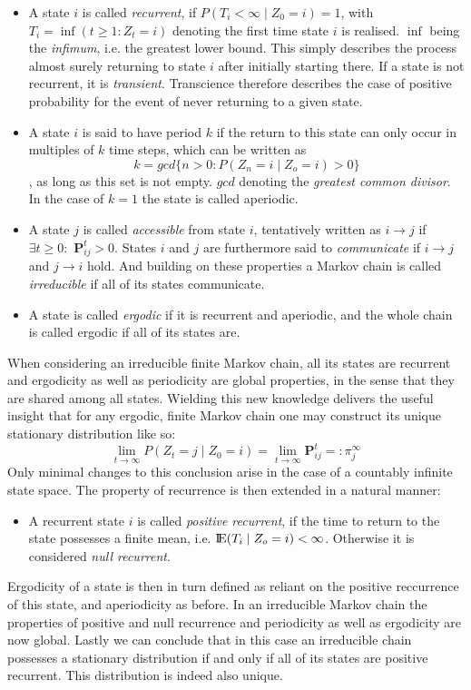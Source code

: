 \documentclass[12pt]{article}
\newcommand{\E}{\mbox{I\negthinspace E}}
\begin{document}
\begin{itemize}
\item{A state $i$ is called \textit{recurrent}, if $P(T_i < \infty \mid Z_0 = i)=1$, with $T_i = \inf (t \geq 1: Z_t = i)$ denoting the first time state $i$ is realised. $\inf$ being the \textit{infimum}, i.e. the greatest lower bound. This simply describes the process almost surely returning to state $i$ after initially starting there. If a state is not recurrent, it is \textit{transient}. Transcience therefore describes the case of positive probability for the event of never returning to a given state.}

\item{A state $i$ is said to have period $k$ if the return to this state can only occur in multiples of $k$ time steps, which can be written as
\[k = gcd\{n >0 : P(Z_n  = i \mid Z_o = i) > 0\}\], as long as this set is not empty. $gcd$ denoting the \textit{greatest common divisor}. In the case of $k=1$ the state is called aperiodic.}

\item{A state $j$ is called \textit{accessible} from state $i$, tentatively written as $i \to j$ if $\exists t \geq 0:$ $\textbf{P}^t_{ij} > 0 $. States $i$ and $j$ are furthermore said to \textit{communicate} if $i \to j$ and $j \to i$ hold. And building on these properties a Markov chain is called \textit{irreducible} if all of its states communicate.}
\item{A state is called \textit{ergodic} if it is recurrent and aperiodic, and the whole chain is called ergodic if all of its states are.}
\end{itemize}
When considering an irreducible finite Markov chain, all its states are recurrent and ergodicity as well as periodicity are global properties, in the sense that they are shared among all states. Wielding this new knowledge delivers the useful insight that for any ergodic, finite Markov chain one may construct its unique stationary distribution like so:
\[
\lim_{t \to \infty} P(Z_t = j \mid Z_0 = i) = \lim_{t \to \infty} \textbf{P}^{t}_{ij} =: \pi^{\infty}_j
\]
Only minimal changes to this conclusion arise in the case of a countably infinite state space. The property of recurrence is then extended in a natural manner:
\begin{itemize}
\item{A recurrent state $i$ is called \textit{positive recurrent}, if the time to return to the state possesses a finite mean, i.e. $\E (T_i \mid Z_o = i) < \infty$. Otherwise it is considered \textit{null recurrent}.}
\end{itemize}
Ergodicity of a state is then in turn defined as reliant on the positive reccurrence of this state, and aperiodicity as before. In an irreducible Markov chain the properties of positive and null recurrence and periodicity as well as ergodicity are now global. Lastly we can conclude that  in this case an irreducible chain possesses a stationary distribution if and only if all of its states are positive recurrent. This distribution is indeed also unique.
\end{document}
